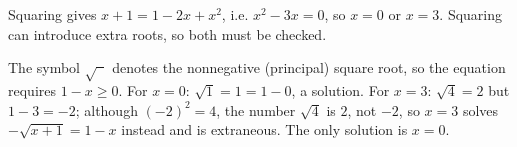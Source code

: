 Squaring gives $x+1=1-2x+x^2$, i.e. $x^2-3x=0$, so $x=0$ or $x=3$. Squaring can introduce extra roots, so both must be checked.

The symbol $\sqrt{\phantom{x}}$ denotes the nonnegative (principal) square root, so the equation requires $1-x\ge0$. For $x=0$: $\sqrt1=1=1-0$, a solution. For $x=3$: $\sqrt4=2$ but $1-3=-2$; although $(-2)^2=4$, the number $\sqrt4$ is $2$, not $-2$, so $x=3$ solves $-\sqrt{x+1}=1-x$ instead and is extraneous. The only solution is $\boxed{x=0}$.
